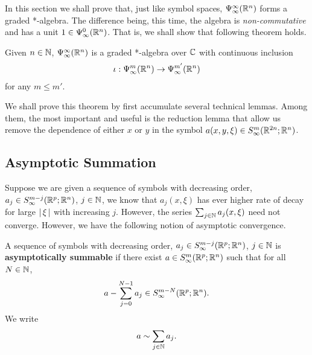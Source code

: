 \documentclass[12pt]{article}
\begin{document}
In this section we shall prove that, just like symbol spaces, $\Psi^\infty_\infty({\mathbb R}^n)$ forms a graded *-algebra. The difference being, this time, the algebra is \emph{non-commutative} and has a unit $1 \in \Psi^{0}_{\infty}({\mathbb R}^n)$. That is, we shall show that following theorem holds. 
\begin{ftheorem}[Summary] 
    Given $n \in {\ensuremath {\mathbb N}}$, $\Psi^\infty_\infty({\mathbb R}^n)$ is a graded *-algebra over ${\mathbb C}$ with continuous inclusion 
    \begin{align*}
        \iota : \Psi^m_\infty({\mathbb R}^n) \to \Psi^{m'}_\infty({\mathbb R}^n)
    \end{align*}
    for any $m \leq m'$. 
\end{ftheorem}

We shall prove this theorem by first accumulate several technical lemmas. Among them, the most important and useful is the reduction lemma that allow us remove the dependence of either $x$ or $y$ in the symbol $a(x, y, \xi) \in S^{m}_\infty({\mathbb R}^{2n}; {\mathbb R}^n)$. 

\subsection{Asymptotic Summation}
Suppose we are given a sequence of symbols with decreasing order, $a_j \in S^{m-j}_\infty({\mathbb R}^{p}; {\mathbb R}^n)$, $j \in {\ensuremath {\mathbb N}}$, we know that  $a_j(x, \xi)$ has ever higher rate of decay for large $\left|\, \xi\,\right|$ with increasing $j$. However, the series $\sum_{j \in {\ensuremath {\mathbb N}}} a_j(x, \xi)$ need not converge. However, we have the following notion of asymptotic convergence. 
\begin{fdefinition} 
    A sequence of symbols with decreasing order, $a_j \in S^{m-j}_\infty({\mathbb R}^{p}; {\mathbb R}^n)$, $j \in {\ensuremath {\mathbb N}}$ is \textbf{asymptotically summable} if there exist $a \in S^{m}_\infty({\mathbb R}^{p}; {\mathbb R}^n)$ such that for all $N \in {\ensuremath {\mathbb N}}$, 
    \begin{align*}
        a - \sum_{j = 0}^{N -1} a_j \in S^{m-N}_\infty({\mathbb R}^{p}; {\mathbb R}^n). 
    \end{align*}
    We write
    \begin{align*}
        a \sim \sum_{j \in {\ensuremath {\mathbb N}}} a_j. 
    \end{align*}
\end{fdefinition}
\end{document}
